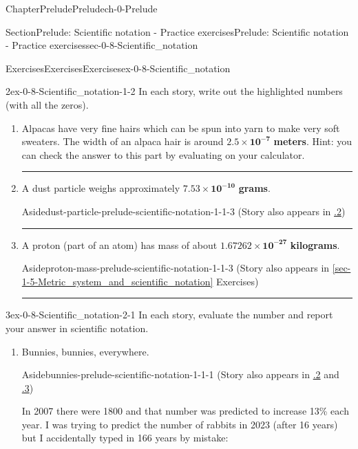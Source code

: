 \documentclass[twoside,11pt,]{book}
\newcommand{\xreffont}{\relax}
\newcommand{\terminology}[1]{\textbf{#1}}
\newlength{\workspacestrutwidth}
\numberwithin{equation}{section}
\begin{document}
\begin{chapterptx}{Chapter}{Prelude}{}{Prelude}{}{}{ch-0-Prelude}
\begin{sectionptx}{Section}{Prelude: Scientific notation - Practice exercises}{}{Prelude: Scientific notation - Practice exercises}{}{}{sec-0-8-Scientific_notation}
\begin{exercises-subsection-numberless}{Exercises}{Exercises}{}{Exercises}{}{}{ex-0-8-Scientific_notation}
\begin{divisionexercise}{2}{}{}{ex-0-8-Scientific_notation-1-2}
In each story, write out the highlighted numbers (with all the zeros).%
\begin{enumerate}[label=(\alph*),ref=\alph*]%
\item\label{alpaca-prelude-scientific-notation}Alpacas have very fine hairs which can be spun into yarn to make very soft sweaters. The width of an alpaca hair is around \(\mathbf{2.5 \times 10^{-7}}\) \terminology{meters}. Hint: you can check the answer to this part by evaluating on your calculator.%
\par\rule{\workspacestrutwidth}{0.5in}%
\item\label{dust-particle-prelude-scientific-notation}A dust particle weighs approximately \(\mathbf{7.53 \times 10^{-10}}\) \terminology{grams}. \begin{aside}{Aside}{}{dust-particle-prelude-scientific-notation-1-1-3}%
(Story also appears in \hyperlink{dust-particle-scientific-notation}{{\xreffont 1.5.2}})%
\end{aside}
%
\par\rule{\workspacestrutwidth}{0.5in}%
\item\label{proton-mass-prelude-scientific-notation}A proton (part of an atom) has mass of about \(\mathbf{1.67262 \times 10^{-27}}\) \terminology{kilograms}. \begin{aside}{Aside}{}{proton-mass-prelude-scientific-notation-1-1-3}%
(Story also appears in \hyperref[sec-1-5-Metric_system_and_scientific_notation]{{\xreffont\ref{sec-1-5-Metric_system_and_scientific_notation}}} Exercises)%
\end{aside}
%
\par\rule{\workspacestrutwidth}{0.5in}%
\end{enumerate}%
\end{divisionexercise}%
\clearpage
\begin{divisionexercise}{3}{}{}{ex-0-8-Scientific_notation-2-1}%
In each story, evaluate the number and report your answer in scientific notation.%
\begin{enumerate}[label=(\alph*),ref=\alph*]%
\item\label{bunnies-prelude-scientific-notation}Bunnies, bunnies, everywhere. \begin{aside}{Aside}{}{bunnies-prelude-scientific-notation-1-1-1}%
(Story also appears in \hyperlink{bunnies-first-look-exponential}{{\xreffont 2.2.2}} and \hyperlink{bunnies-modeling-exponential}{{\xreffont 5.1.3}})%
\end{aside}
 In 2007 there were 1800 and that number was predicted to increase 13\% each year. I was trying to predict the number of rabbits in 2023 (after 16 years) but I accidentally typed in 166 years by mistake:%

\end{enumerate}
\end{divisionexercise}
\end{exercises-subsection-numberless}
\end{sectionptx}
\end{chapterptx}
\end{document}
